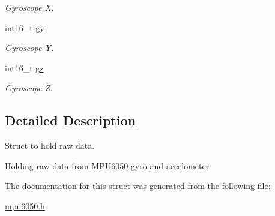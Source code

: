 \begin{DoxyCompactItemize}
\begin{DoxyCompactList}\small\item\em Gyroscope X. \end{DoxyCompactList}\item 
\hypertarget{structmpu6050__raw__t_afb68b16d9ed22f9c20428062bc0d948d}{}int16\+\_\+t \hyperlink{structmpu6050__raw__t_afb68b16d9ed22f9c20428062bc0d948d}{gy}\label{structmpu6050__raw__t_afb68b16d9ed22f9c20428062bc0d948d}

\begin{DoxyCompactList}\small\item\em Gyroscope Y. \end{DoxyCompactList}\item 
\hypertarget{structmpu6050__raw__t_a20c3999ec0d186ab6c3cbaa53abd04a2}{}int16\+\_\+t \hyperlink{structmpu6050__raw__t_a20c3999ec0d186ab6c3cbaa53abd04a2}{gz}\label{structmpu6050__raw__t_a20c3999ec0d186ab6c3cbaa53abd04a2}

\begin{DoxyCompactList}\small\item\em Gyroscope Z. \end{DoxyCompactList}\end{DoxyCompactItemize}


\subsection{Detailed Description}
Struct to hold raw data. 

Holding raw data from M\+P\+U6050 gyro and accelometer 

The documentation for this struct was generated from the following file\+:\begin{DoxyCompactItemize}
\item 
\hyperlink{mpu6050_8h}{mpu6050.\+h}\end{DoxyCompactItemize}
